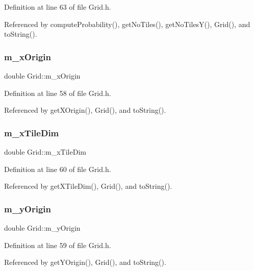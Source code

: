 Definition at line 63 of file Grid.\+h.



Referenced by compute\+Probability(), get\+No\+Tiles(), get\+No\+Tiles\+Y(), Grid(), and to\+String().

\mbox{\label{class_grid_ae109d428ac5489815748e92fdde1b91f}} 
\subsubsection{m\+\_\+x\+Origin}
{\footnotesize\ttfamily double Grid\+::m\+\_\+x\+Origin\hspace{0.3cm}{\ttfamily [private]}}



Definition at line 58 of file Grid.\+h.



Referenced by get\+X\+Origin(), Grid(), and to\+String().

\mbox{\label{class_grid_a48c3d1fc34a14bff8b9176558a8b6f4e}} 
\subsubsection{m\+\_\+x\+Tile\+Dim}
{\footnotesize\ttfamily double Grid\+::m\+\_\+x\+Tile\+Dim\hspace{0.3cm}{\ttfamily [private]}}



Definition at line 60 of file Grid.\+h.



Referenced by get\+X\+Tile\+Dim(), Grid(), and to\+String().

\mbox{\label{class_grid_a16b2fc5a6e96ad2d59d59b52db83f4aa}} 
\subsubsection{m\+\_\+y\+Origin}
{\footnotesize\ttfamily double Grid\+::m\+\_\+y\+Origin\hspace{0.3cm}{\ttfamily [private]}}



Definition at line 59 of file Grid.\+h.



Referenced by get\+Y\+Origin(), Grid(), and to\+String().

